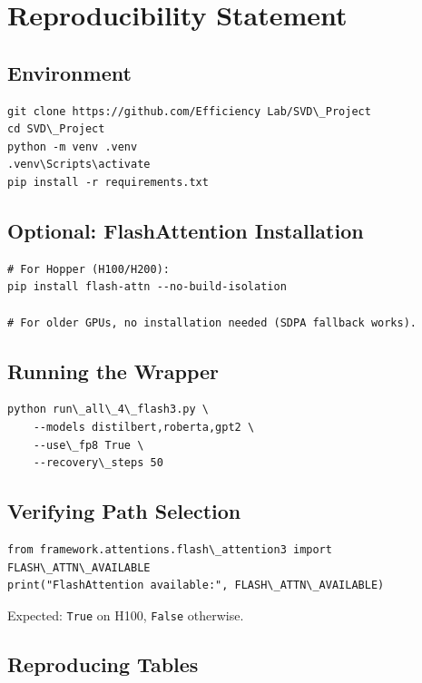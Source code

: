 \section{Reproducibility Statement}

\subsection{Environment}

\begin{lstlisting}
git clone https://github.com/Efficiency Lab/SVD\_Project
cd SVD\_Project
python -m venv .venv
.venv\Scripts\activate
pip install -r requirements.txt
\end{lstlisting}

\subsection{Optional: FlashAttention Installation}

\begin{lstlisting}
# For Hopper (H100/H200):
pip install flash-attn --no-build-isolation

# For older GPUs, no installation needed (SDPA fallback works).
\end{lstlisting}

\subsection{Running the Wrapper}

\begin{lstlisting}
python run\_all\_4\_flash3.py \
    --models distilbert,roberta,gpt2 \
    --use\_fp8 True \
    --recovery\_steps 50
\end{lstlisting}

\subsection{Verifying Path Selection}

\begin{lstlisting}
from framework.attentions.flash\_attention3 import FLASH\_ATTN\_AVAILABLE
print("FlashAttention available:", FLASH\_ATTN\_AVAILABLE)
\end{lstlisting}

Expected: \texttt{True} on H100, \texttt{False} otherwise.

\subsection{Reproducing Tables}


